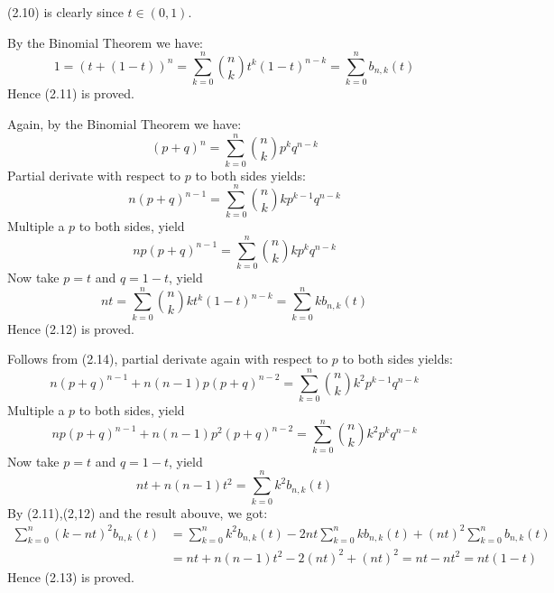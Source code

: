 \documentclass[11pt]{elegantbook}
\begin{document}
\begin{solution}
  (2.10) is clearly since $t\in(0,1)$.
  
  By the Binomial Theorem we have:
  \begin{equation*}
    1 = (t+(1-t))^n = \sum_{k=0}^n \binom{n}{k}t^k(1-t)^{n-k} = \sum_{k=0}^n b_{n,k}(t)
  \end{equation*}
  Hence (2.11) is proved.

  Again, by the Binomial Theorem we have:
  \begin{equation*}
    (p+q)^n=\sum_{k=0}^n \binom{n}{k}p^k q^{n-k}
  \end{equation*}
  Partial derivate with respect to $p$ to both sides yields:
  \begin{equation*}
    n(p+q)^{n-1}=\sum_{k=0}^n \binom{n}{k}kp^{k-1} q^{n-k}
  \end{equation*}
  Multiple a $p$ to both sides, yield
  \begin{equation}
    np(p+q)^{n-1}=\sum_{k=0}^n \binom{n}{k}kp^k q^{n-k}
  \end{equation}
  Now take $p=t$ and $q=1-t$, yield
  \begin{equation*}
    nt=\sum_{k=0}^n \binom{n}{k}kt^k (1-t)^{n-k} = \sum_{k=0}^n kb_{n,k}(t)
  \end{equation*}
  Hence (2.12) is proved.

  Follows from (2.14), partial derivate again with respect to $p$ to both sides yields:
  \begin{equation*}
    n(p+q)^{n-1} + n(n-1)p(p+q)^{n-2} =\sum_{k=0}^n \binom{n}{k}k^2p^{k-1} q^{n-k}
  \end{equation*}
  Multiple a $p$ to both sides, yield
  \begin{equation*}
    np(p+q)^{n-1} + n(n-1)p^2(p+q)^{n-2} =\sum_{k=0}^n \binom{n}{k}k^2p^k q^{n-k}
  \end{equation*}
  Now take $p=t$ and $q=1-t$, yield
  \begin{equation*}
    nt + n(n-1)t^2 = \sum_{k=0}^n k^2 b_{n,k}(t)
  \end{equation*}
  By (2.11),(2,12) and the result abouve, we got:
  \begin{align*}
    \sum_{k=0}^n (k-nt)^2b_{n,k}(t) &= \sum_{k=0}^n k^2b_{n,k}(t) - 2nt\sum_{k=0}^n kb_{n,k}(t) + (nt)^2\sum_{k=0}^n b_{n,k}(t)\\
    &= nt + n(n-1)t^2 - 2(nt)^2 + (nt)^2 = nt - nt^2 = nt(1-t)
  \end{align*}
  Hence (2.13) is proved.
\end{solution}
\end{document}
